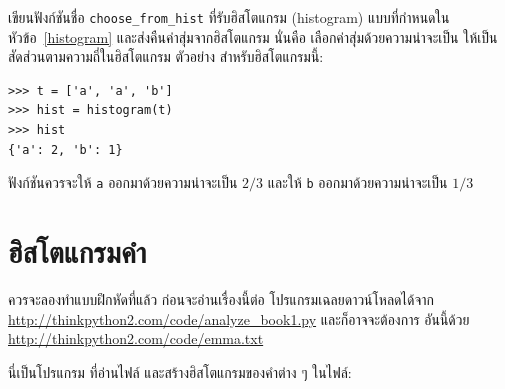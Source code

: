 \begin{exercise}


เขียนฟังก์ชันชื่อ \verb|choose_from_hist|
ที่รับฮิสโตแกรม (histogram) แบบที่กำหนดในหัวข้อ~\ref{histogram}
และส่งคืนค่าสุ่มจากฮิสโตแกรม
นั่นคือ เลือกค่าสุ่มด้วยความน่าจะเป็น ให้เป็นสัดส่วนตามความถี่ในฮิสโตแกรม
ตัวอย่าง สำหรับฮิสโตแกรมนี้:

\begin{verbatim}
>>> t = ['a', 'a', 'b']
>>> hist = histogram(t)
>>> hist
{'a': 2, 'b': 1}
\end{verbatim}
%
%
ฟังก์ชันควรจะให้ \verb|a| ออกมาด้วยความน่าจะเป็น {\scriptsize$2/3$} 
และให้ \verb|b| ออกมาด้วยความน่าจะเป็น {\scriptsize$1/3$}
%
\end{exercise}


\section{ฮิสโตแกรมคำ}


ควรจะลองทำแบบฝึกหัดที่แล้ว ก่อนจะอ่านเรื่องนี้ต่อ
โปรแกรมเฉลยดาวน์โหลดได้จาก
\url{http://thinkpython2.com/code/analyze_book1.py}
และก็อาจจะต้องการ อันนี้ด้วย
\url{http://thinkpython2.com/code/emma.txt}


นี่เป็นโปรแกรม ที่อ่านไฟล์ และสร้างฮิสโตแกรมของคำต่าง ๆ ในไฟล์:

